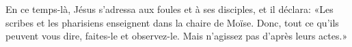 En ce temps-là, Jésus s’adressa aux foules et à ses disciples, et il déclara:
	«Les scribes et les pharisiens enseignent dans la chaire de Moïse.
Donc, tout ce qu’ils peuvent vous dire, faites-le et observez-le.
	Mais n’agissez pas d’après leurs actes.»
